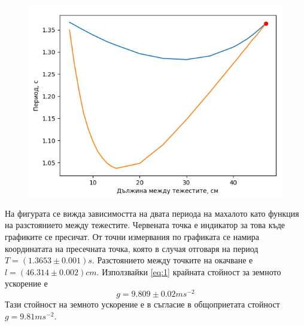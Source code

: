 \documentclass[aps, prb, twocolumn, a4paper, floatfix, reprint]{revtex4-2}
\begin{document}
\begin{figure}[H]
    \includegraphics[width=0.9\columnwidth, keepaspectratio=true]{fig_1.png}
\end{figure}

На фигурата се вижда зависимостта на двата периода на махалото като функция на разстоянието между тежестите. Червената точка е индикатор за това къде графиките се пресичат. От точни измервания по графиката се намира координатата на пресечната точка, която в случая отговаря на период $T=(1.3653 \pm 0.001)s$. Разстоянието между точките на окачване е $l=(46.314 \pm 0.002)cm$. Използвайки \eqref{eq:1} крайната стойност за земното ускорение е 
\begin{equation*}
    g = 9.809 \pm 0.02 ms^{-2} 
\end{equation*} 
Тази стойност на земното ускорение е в съгласие в общоприетата стойност $g=9.81 ms^{-2}$.
\end{document}
